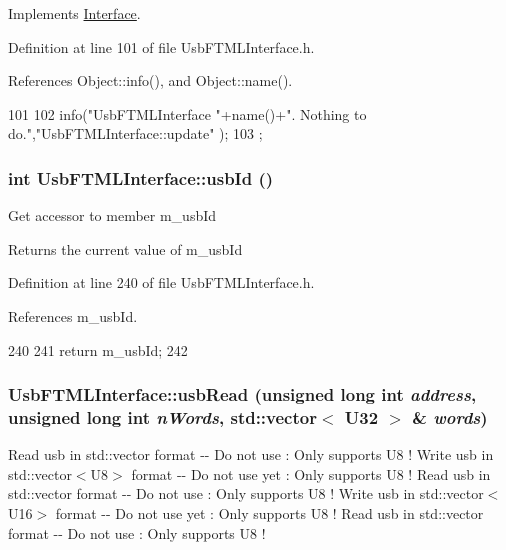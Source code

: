 Implements \hyperlink{classInterface_a30e71ffbe36091df9f7c0838dd4b60d2}{Interface}.

Definition at line 101 of file UsbFTMLInterface.h.

References Object::info(), and Object::name().


\begin{DoxyCode}
101                          {
102     info("UsbFTMLInterface "+name()+". Nothing to do.","UsbFTMLInterface::update"
      );
103   };
\end{DoxyCode}
\hypertarget{classUsbFTMLInterface_a99016c7661780ed89195dc507d3516fc}{
\subsubsection[{usbId}]{\setlength{\rightskip}{0pt plus 5cm}int UsbFTMLInterface::usbId ()}}
\label{classUsbFTMLInterface_a99016c7661780ed89195dc507d3516fc}
Get accessor to member m\_\-usbId \begin{DoxyReturn}{Returns}
the current value of m\_\-usbId 
\end{DoxyReturn}


Definition at line 240 of file UsbFTMLInterface.h.

References m\_\-usbId.


\begin{DoxyCode}
240                {
241     return m_usbId;
242   }
\end{DoxyCode}
\hypertarget{classUsbFTMLInterface_adbedf78154f460303edc20420c22c333}{
\subsubsection[{usbRead}]{ UsbFTMLInterface::usbRead (unsigned long int {\em address}, \/  unsigned long int {\em nWords}, \/  std::vector$<$ {\bf U32} $>$ \& {\em words})}}
\label{classUsbFTMLInterface_adbedf78154f460303edc20420c22c333}
Read usb in std::vector format -\/-\/ Do not use : Only supports U8 ! Write usb in std::vector$<$U8$>$ format -\/-\/ Do not use yet : Only supports U8 ! Read usb in std::vector format -\/-\/ Do not use : Only supports U8 ! Write usb in std::vector$<$U16$>$ format -\/-\/ Do not use yet : Only supports U8 ! Read usb in std::vector format -\/-\/ Do not use : Only supports U8 ! 

